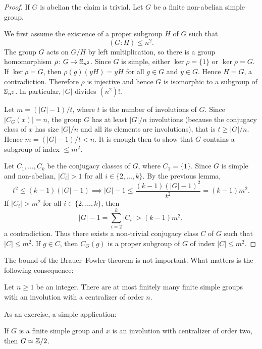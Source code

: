 \begin{proof}
    If $G$ is abelian the claim is trivial. Let $G$ be a finite non-abelian simple group.
    
    We first assume the existence of a proper subgroup $H$ of $G$ 
    such that 
    \[
    (G:H)\leq n^2.
    \]
    The group $G$ acts on $G/H$ 
    by left multiplication, so there is a group homomorphism 
    $\rho\colon G\to\mathbb{S}_{n^2}$. Since $G$ is simple, either 
    $\ker\rho=\{1\}$ or $\ker\rho=G$. If $\ker\rho=G$, then
    $\rho(g)(yH)=yH$ for all $g\in G$ and $y\in G$. 
    Hence $H=G$, a contradiction. Therefore $\rho$ is injective
    and hence $G$ is isomorphic to a subgroup of $\mathbb{S}_{n^2}$. 
    In particular, $|G|$ divides $(n^2)!$. 

    Let $m=(|G|-1)/t$, where $t$ is the number of involutions of $G$. 
    Since $|C_G(x)|=n$, the group $G$ has at least $|G|/n$ involutions (because
    the conjugacy class of $x$ has size $|G|/n$ and all its elements are involutions), 
    that is $t\geq |G|/n$. Hence 
    $m=(|G|-1)/t<n$. It is enough then to show that
    $G$ contains a subgroup of index $\leq m^2$. 

    Let $C_1,\dots,C_k$ be the conjugacy classes of $G$, where $C_1=\{1\}$. 
    Since $G$ is simple and non-abelian, $|C_i|>1$ 
    for all $i\in\{2,\dots,k\}$. By the previous lemma, 
    \[
    t^2\leq(k-1)(|G|-1)\implies |G|-1\leq\frac{(k-1)(|G|-1)^2}{t^2}=(k-1)m^2.
    \]
    If $|C_i|>m^2$ for all $i\in\{2,\dots,k\}$, then
    \[
    |G|-1=\sum_{i=2}^k|C_i|>(k-1)m^2,
    \]
    a contradiction. Thus there exists a non-trivial conjugacy class
    $C$ of $G$ such that $|C|\leq m^2$. If $g\in C$, then
    $C_G(g)$ is a proper subgroup of $G$ of index $|C|\leq m^2$.
\end{proof}

The bound of the Brauer--Fowler theorem is not important.
What matters is the following consequence:

\begin{corollary}
    Let $n\geq 1$ be an integer. There are at most finitely many 
    finite simple groups with an involution with a centralizer of order $n$.
\end{corollary}

As an exercise, a simple application: 

\begin{exercise}
    If $G$ is a finite simple group and $x$ is an involution with
    centralizer of order two, then  
    $G\simeq\mathbb{Z}/2$. 
\end{exercise}

